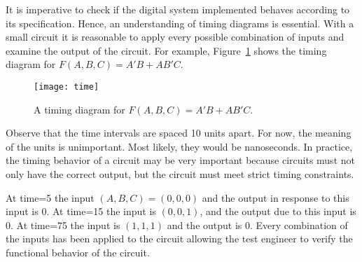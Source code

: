 It is imperative to check if the digital system implemented
behaves according to its specification. Hence, an understanding of
timing diagrams is essential.  With a small circuit it is reasonable
to apply every possible combination of inputs and examine the 
output of the circuit.  For example, Figure~\ref{fig:represenationsTime} shows
the timing diagram for $F(A,B,C) = A'B+AB'C$.

\begin{figure}[ht]
\texttt{[image: time]}
\caption{A timing diagram for $F(A,B,C) = A'B + AB'C$.}
\label{fig:represenationsTime}
\end{figure}

Observe that the time intervals are spaced 10 units apart.  For
now, the meaning of the units is unimportant.  Most likely, they would
be nanoseconds.  In practice, the timing behavior of a circuit
may be very important because circuits must not only have the 
correct output, but the circuit must meet strict timing constraints.

At time=5 the input $(A,B,C)=(0,0,0)$ and the output in response
to this input is 0.  At time=15 the input is $(0,0,1)$, and the
output due to this input is 0.  At time=75 the input is $(1,1,1)$
and the output is 0.  Every combination of the inputs has been 
applied to the circuit allowing the test engineer to verify the 
functional behavior of the circuit.


